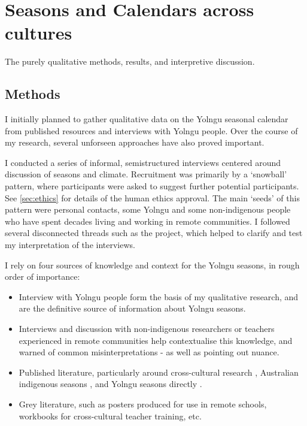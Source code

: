 \chapter{Seasons and Calendars across cultures}
The purely qualitative methods, results, and interpretive discussion.

\section{Methods}

I initially planned to gather qualitative data on the Yolngu seasonal calendar
from published resources and interviews with Yolngu people.
Over the course of my research, several unforseen approaches have also proved important.

I conducted a series of informal, semistructured interviews centered around discussion of seasons and climate.
Recruitment was primarily by a `snowball' pattern, where participants were asked to
suggest further potential participants.
See \autoref{sec:ethics} for details of the human ethics approval.
The main `seeds' of this pattern were personal contacts, some Yolngu and some non-indigenous
people who have spent decades living and working in remote communities.
I followed several disconnected threads such as the \citet{CSIROcals} project,
which helped to clarify and test my interpretation of the interviews.

I rely on four sources of knowledge and context for the Yolngu seasons, in rough order of importance:

\begin{itemize}
\item Interview with Yolngu people form the basis of my qualitative research, and
        are the definitive source of information about Yolngu seasons.
\item Interviews and discussion with non-indigenous researchers or teachers experienced
        in remote communities help contextualise this knowledge, and warned of
        common misinterpretations - as well as pointing out nuance.
\item Published literature, particularly around cross-cultural research \citep[eg.][]{smith1999},
        Australian indigenous seasons \citep[eg.][]{prober2011,oconnor2010}, and Yolngu
        seasons directly \citep{davis1989}.
\item Grey literature, such as posters produced for use in remote schools, workbooks
        for cross-cultural teacher training, etc.
\end{itemize}

